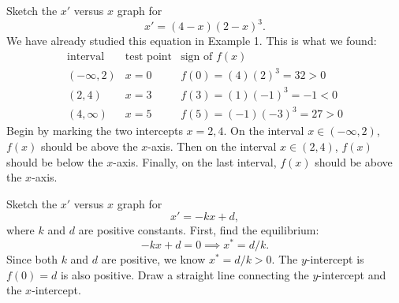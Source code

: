 \documentclass[10pt,letterpaper]{article}
\begin{document}
\begin{example}[7]{
Sketch the $x'$ versus $x$ graph for 
$$x'=(4-x)(2-x)^3.$$
}
We have already studied this equation in Example 1. This is what we found:
\[
\begin{array}{c|c|c}
\text{interval} & \text{test point} & \text{sign of }f(x) \\
\hline
(-\infty,2) & x=0 & f(0)=(4)(2)^3=32>0 \\
(2,4) & x=3 & f(3)=(1)(-1)^3=-1<0 \\
(4,\infty) & x=5 & f(5)=(-1)(-3)^3=27>0
\end{array}
\]   
Begin by marking the two intercepts $x=2,4$. On the interval $x\in(-\infty,2)$, $f(x)$ should be above the $x$-axis. Then on the interval $x\in(2,4)$, $f(x)$ should be below the $x$-axis. Finally, on the last interval, $f(x)$ should be above the $x$-axis.

\begin{figure}[H]
\centering
{}
\end{figure}
\end{example}

\begin{example}[8]{
Sketch the $x'$ versus $x$ graph for 
$$x'=-kx+d,$$
where $k$ and $d$ are positive constants.
}
First, find the equilibrium: 
$$
    -kx+d=0\implies x^* = d/k.
$$
Since both $k$ and $d$ are positive, we know $x^*=d/k>0$. The $y$-intercept is $f(0)=d$ is also positive. Draw a straight line connecting the $y$-intercept and the $x$-intercept. 

\begin{figure}[H]
\centering
{}
\end{figure}
\end{example}
\end{document}
